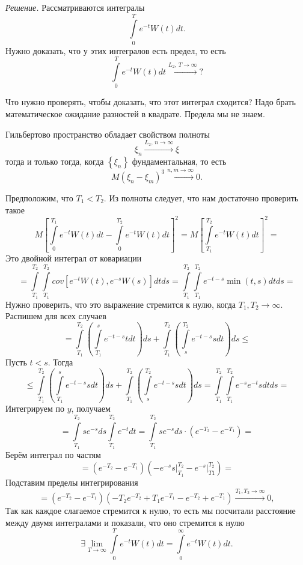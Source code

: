 \textit{Решение.}
Рассматриваются интегралы
$$ \int \limits_0^T e^{-t} W \left( t \right) dt.$$
Нужно доказать, что у этих интегралов есть предел, то есть
$$ \int \limits_0^T e^{-t} W \left( t \right) dt \overset{L_2, \, T \to \infty }{ \to }?$$

Что нужно проверять, чтобы доказать, что этот интеграл сходится?
Надо брать математическое ожидание разностей в квадрате.
Предела мы не знаем.

Гильбертово пространство обладает свойством полноты
$$ \xi_n \overset{L_2, \, n \to \infty }{ \to }
  \xi$$
тогда и только тогда, когда $ \left\{ \xi_n \right\} $ фундаментальная, то есть
$$M \left( \xi_n - \xi_m \right)^3 \overset{n, m \to \infty }{ \to }
  0.$$

Предположим, что $T_1 < T_2$.
Из полноты следует, что нам достаточно проверить такое
$$M \left[
    \int \limits_0^{T_1} e^{-t} W \left( t \right) dt -
    \int \limits_0^{T_2} e^{-t} W \left( t \right) dt \right]^2 =
  M \left[ \int \limits_{T_1}^{T_2} e^{-t} W \left( t \right) dt \right]^2 =$$
Это двойной интеграл от ковариации
$$= \int \limits_{T_1}^{T_2} \int \limits_{T_1}^{T_2}
    cov \left[ e^{-t} W \left( t \right), e^{-s} W \left( s \right) \right] dtds =
  \int \limits_{T_1}^{T_2} \int \limits_{T_1}^{T_2}
    e^{-t-s} \min \left( t, s \right) dtds =$$
Нужно проверить, что это выражение стремится к нулю, когда $T_1, T_2 \to \infty $.
Распишем для всех случаев
$$= \int \limits_{T_1}^{T_2} \left( \int \limits_{T_1}^s e^{-t-s} tdt \right) ds +
  \int \limits_{T_1}^{T_2} \left( \int \limits_s^{T_2} e^{-t-s} sdt \right) ds \leq $$
Пусть $t < s$.
Тогда
$$ \leq \int \limits_{T_1}^{T_2} \left( \int \limits_{T_1}^s e^{-t-s} sdt \right) ds +
  \int \limits_{T_1}^{T_2} \left( \int \limits_s^{T_2} e^{-t-s} sdt \right) ds =
  \int \limits_{T_1}^{T_2} \int \limits_{T_1}^{T_2} e^{-s} e^{-t} sdtds =$$
Интегрируем по $y$, получаем
$$= \int \limits_{T_1}^{T_2} se^{-s} ds \int \limits_{T_1}^{T_2} e^{-t} dt =
  \int \limits_{T_1}^{T_2} se^{-s} ds \cdot \left( e^{-T_2} - e^{-T_1} \right) =$$
Берём интеграл по частям
$$= \left( e^{-T_2} - e^{-T_1} \right)
  \left( \left. -e^{-s} s \right|_{T_1}^{T_2} - \left. e^{-s} \right|_{T1}^{T_2} \right) =$$
Подставим пределы интегрирования
$$= \left( e^{-T_2} - e^{-T_1} \right)
  \left( -T_2 e^{-T_2} + T_1 e^{-T_1} - e^{-T_2} + e^{-T_1} \right)
  \overset{T_1, T_2 \to \infty }{ \to } 0,$$
Так как каждое слагаемое стремится к нулю,
то есть мы посчитали расстояние между двумя интегралами и показали, что оно стремится к нулю
$$ \exists \lim \limits_{T \to \infty } \int \limits_0^T e^{-t} W \left( t \right) dt =
  \int \limits_0^{ \infty } e^{-t} W \left( t \right) dt.$$


